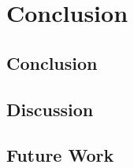 \chapter{Conclusion}
\label{chap:concl}
\section {Conclusion}
\section {Discussion}
\section {Future Work}
